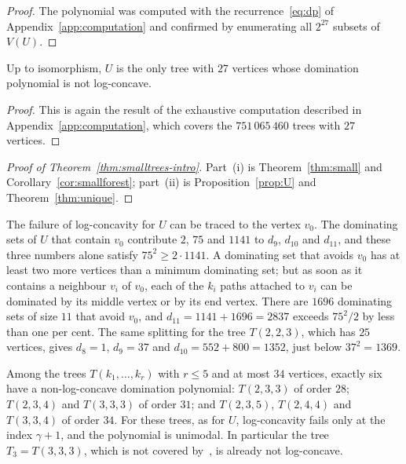 \documentclass[smallextended,envcountsect,envcountsame]{svjour3}
\begin{document}
\begin{proof}
The polynomial was computed with the recurrence~\eqref{eq:dp} of
Appendix~\ref{app:computation} and confirmed by enumerating all $2^{27}$
subsets of $V(U)$.
\end{proof}

\begin{theorem}\label{thm:unique}
Up to isomorphism, $U$ is the only tree with $27$ vertices whose domination
polynomial is not log-concave.
\end{theorem}

\begin{proof}
This is again the result of the exhaustive computation described in
Appendix~\ref{app:computation}, which covers the $751\,065\,460$ trees with
$27$ vertices.
\end{proof}

\begin{proof}[Proof of Theorem~\ref{thm:smalltrees-intro}]
Part~(i) is Theorem~\ref{thm:small} and Corollary~\ref{cor:smallforest};
part~(ii) is Proposition~\ref{prop:U} and Theorem~\ref{thm:unique}.
\end{proof}

\begin{remark}\label{rem:mechanism}
The failure of log-concavity for $U$ can be traced to the vertex $v_0$. The
dominating sets of $U$ that contain $v_0$ contribute $2$, $75$ and $1141$ to
$d_9$, $d_{10}$ and $d_{11}$, and these three numbers alone satisfy
$75^2\ge2\cdot1141$. A dominating set that avoids $v_0$ has at least two more
vertices than a minimum dominating set; but as soon as it contains a
neighbour $v_i$ of $v_0$, each of the $k_i$ paths attached to $v_i$ can be
dominated by its middle vertex or by its end vertex. There are $1696$
dominating sets of size $11$ that avoid $v_0$, and
$d_{11}=1141+1696=2837$ exceeds $75^2/2$ by less than one per cent. The same
splitting for the tree $T(2,2,3)$, which has $25$ vertices, gives $d_8=1$,
$d_9=37$ and $d_{10}=552+800=1352$, just below $37^2=1369$.
\end{remark}

\begin{remark}\label{rem:family}
Among the trees $T(k_1,\dots,k_r)$ with $r\le5$ and at most $34$ vertices,
exactly six have a non-log-concave domination polynomial: $T(2,3,3)$ of
order $28$; $T(2,3,4)$ and $T(3,3,3)$ of order $31$; and $T(2,3,5)$,
$T(2,4,4)$ and $T(3,3,4)$ of order $34$. For these trees, as for $U$,
log-concavity fails only at the index $\gamma+1$, and the polynomial is
unimodal. In particular the tree $T_3=T(3,3,3)$, which is not covered
by~\cite[Proposition~1]{BS}, is already not log-concave.
\end{remark}
\end{document}
